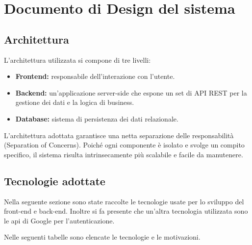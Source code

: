 \documentclass[a4paper,11pt]{article}
\begin{document}
\newpage
\section{Documento di Design del sistema}
\subsection{Architettura}

L'architettura utilizzata si compone di tre livelli:

\begin{itemize}
    \item \textbf{Frontend:} responsabile dell’interazione con l’utente.
    \item \textbf{Backend:} un’applicazione server-side che espone un set di API REST per la gestione dei dati e la logica di business.
    \item \textbf{Database:} sistema di persistenza dei dati relazionale.
\end{itemize}

L'architettura adottata garantisce una netta separazione delle responsabilità (Separation of Concerns). Poiché ogni componente è isolato e svolge un compito specifico, il sistema risulta intrinsecamente più scalabile e facile da manutenere.
\clearpage
\subsection{Tecnologie adottate}
Nella seguente sezione sono state raccolte le tecnologie usate per lo sviluppo del front-end e back-end. 
Inoltre si fa presente che un'altra tecnologia utilizzata sono le api di Google per l'autenticazione. 

Nelle seguenti tabelle sono elencate le tecnologie e le motivazioni. 
\end{document}
